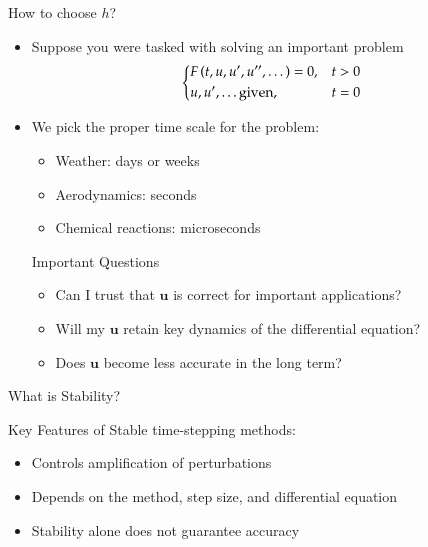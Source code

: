 \documentclass[10pt]{beamer}
\begin{document}
\begin{frame}{How to choose $h$?}

    \begin{itemize}
        \item Suppose you were tasked with solving an important problem 
            $$\begin{dcases}
            F\left(t, u, u', u'', \dots\right) = 0,  & t>0\\
               u, u', \dots \text{given}, & t=0
            \end{dcases}$$
        \item We pick the proper time scale for the problem: 
        \begin{itemize}
            \item Weather: days or weeks 
            \item Aerodynamics: seconds 
            \item Chemical reactions: microseconds 
        \end{itemize}\bigskip  
        \begin{alertblock}{Important Questions}
        \begin{itemize}
            \item Can I trust that $\textbf{u}$ is correct for important applications? 
            \item Will my $\textbf{u}$ retain key dynamics of the differential equation? 
            \item Does $\textbf{u}$ become less accurate in the long term?
        \end{itemize}
        \end{alertblock}
    \end{itemize}    
\end{frame}


\begin{frame}{What is Stability?}

    \vspace{5mm}
    Key Features of Stable time-stepping methods:
    \begin{itemize}
        \item Controls amplification of perturbations 
        \item Depends on the method, step size, and differential equation
        \item Stability alone does not guarantee accuracy
    \end{itemize}
\end{frame}
\end{document}
